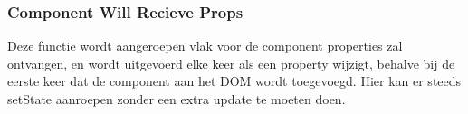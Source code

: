 	\subsubsection{Component Will Recieve Props}
		
		Deze functie wordt aangeroepen vlak voor de component properties zal ontvangen, en wordt uitgevoerd elke keer als een property wijzigt, behalve bij de eerste keer dat de component aan het DOM wordt toegevoegd. Hier kan er steeds setState aanroepen zonder een extra update te moeten doen.
